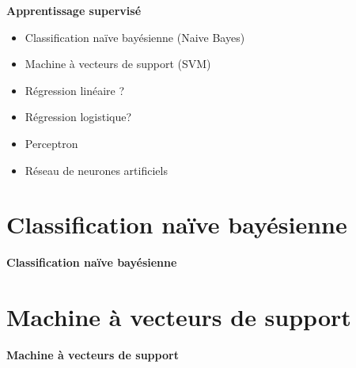 \documentclass[]{beamer} %
\begin{document}
\begin{frame}

\begin{center}
	\Huge\bfseries Apprentissage supervisé
\end{center}

\begin{itemize}
	\item Classification naïve bayésienne (Naive Bayes)
	\item Machine à vecteurs de support (SVM)
	\item Régression linéaire ?
	\item Régression logistique?
	\item Perceptron
	\item Réseau de neurones artificiels
\end{itemize}

\end{frame}

\section{Classification naïve bayésienne}

\begin{frame}

\begin{center}
	\Huge\bfseries Classification naïve bayésienne
\end{center}

\end{frame}


\section{Machine à vecteurs de support}

\begin{frame}

\begin{center}
	\Huge\bfseries Machine à vecteurs de support
\end{center}

\end{frame}
\end{document}
